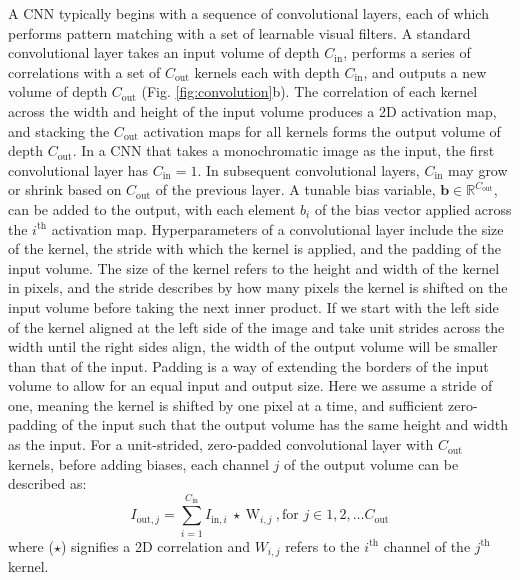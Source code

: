 \documentclass[fleqn,10pt]{wlscirep}
\begin{document}
A CNN typically begins with a sequence of convolutional layers, each of which performs pattern matching with a set of learnable visual filters. A standard convolutional layer takes an input volume of depth $C_\text{in}$, performs a series of correlations with a set of $C_\text{out}$ kernels each with depth $C_\text{in}$, and outputs a new volume of depth $C_\text{out}$ (Fig. \ref{fig:convolution}b). The correlation of each kernel across the width and height of the input volume produces a 2D activation map, and stacking the $C_\text{out}$ activation maps for all kernels forms the output volume of depth $C_\text{out}$. In a CNN that takes a monochromatic image as the input, the first convolutional layer has $C_\text{in} = 1$. In subsequent convolutional layers, $C_\text{in}$ may grow or shrink based on $C_\text{out}$ of the previous layer. A tunable bias variable, $\textbf{b} \in \mathbb{R}^{C_\text{out}}$, can be added to the output, with each element $b_i$ of the bias vector applied across the $i^\text{th}$ activation map. Hyperparameters of a convolutional layer include the size of the kernel, the stride with which the kernel is applied, and the padding of the input volume. The size of the kernel refers to the height and width of the kernel in pixels, and the stride describes by how many pixels the kernel is shifted on the input volume before taking the next inner product. If we start with the left side of the kernel aligned at the left side of the image and take unit strides across the width until the right sides align, the width of the output volume will be smaller than that of the input. Padding is a way of extending the borders of the input volume to allow for an equal input and output size. Here we assume a stride of one, meaning the kernel is shifted by one pixel at a time, and sufficient zero-padding of the input such that the output volume has the same height and width as the input. For a unit-strided, zero-padded convolutional layer with $C_\text{out}$ kernels, before adding biases, each channel $j$ of the output volume can be described as:
\begin{equation}
I_{\text{out}, j}  = \sum_{i = 1}^{C_\text{in}} I_{\text{in}, i} \ \star \ \text{W}_{i,j}\ , \text{for } j \in 1, 2, \hdots C_\text{out} 
\end{equation}
where ($\star$) signifies a 2D correlation and $W_{i,j}$ refers to the $i^\text{th}$ channel of the $j^\text{th}$ kernel.
\end{document}
